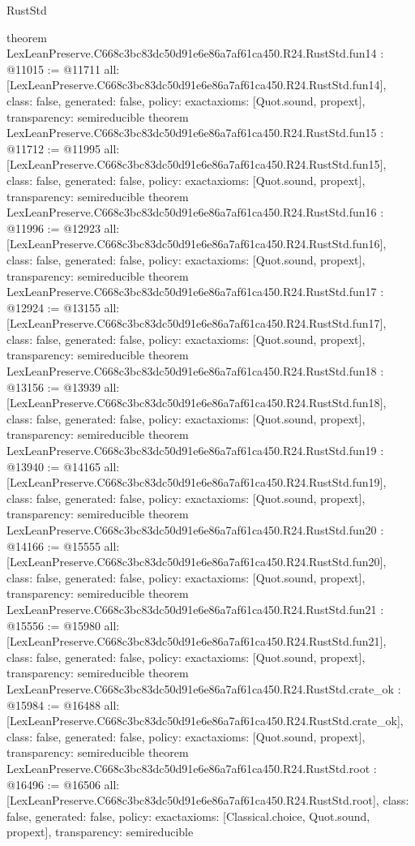 \begin{lexlean}{RustStd}
\begin{coremodule}
{}
theorem LexLeanPreserve.C668c3bc83dc50d91e6e86a7af61ca450.R24.RustStd.fun14 : @11015 := @11711 {
  all: [LexLeanPreserve.C668c3bc83dc50d91e6e86a7af61ca450.R24.RustStd.fun14],
  class: false,
  generated: false,
  policy: exact{axioms: [Quot.sound, propext]},
  transparency: semireducible
}
theorem LexLeanPreserve.C668c3bc83dc50d91e6e86a7af61ca450.R24.RustStd.fun15 : @11712 := @11995 {
  all: [LexLeanPreserve.C668c3bc83dc50d91e6e86a7af61ca450.R24.RustStd.fun15],
  class: false,
  generated: false,
  policy: exact{axioms: [Quot.sound, propext]},
  transparency: semireducible
}
theorem LexLeanPreserve.C668c3bc83dc50d91e6e86a7af61ca450.R24.RustStd.fun16 : @11996 := @12923 {
  all: [LexLeanPreserve.C668c3bc83dc50d91e6e86a7af61ca450.R24.RustStd.fun16],
  class: false,
  generated: false,
  policy: exact{axioms: [Quot.sound, propext]},
  transparency: semireducible
}
theorem LexLeanPreserve.C668c3bc83dc50d91e6e86a7af61ca450.R24.RustStd.fun17 : @12924 := @13155 {
  all: [LexLeanPreserve.C668c3bc83dc50d91e6e86a7af61ca450.R24.RustStd.fun17],
  class: false,
  generated: false,
  policy: exact{axioms: [Quot.sound, propext]},
  transparency: semireducible
}
theorem LexLeanPreserve.C668c3bc83dc50d91e6e86a7af61ca450.R24.RustStd.fun18 : @13156 := @13939 {
  all: [LexLeanPreserve.C668c3bc83dc50d91e6e86a7af61ca450.R24.RustStd.fun18],
  class: false,
  generated: false,
  policy: exact{axioms: [Quot.sound, propext]},
  transparency: semireducible
}
theorem LexLeanPreserve.C668c3bc83dc50d91e6e86a7af61ca450.R24.RustStd.fun19 : @13940 := @14165 {
  all: [LexLeanPreserve.C668c3bc83dc50d91e6e86a7af61ca450.R24.RustStd.fun19],
  class: false,
  generated: false,
  policy: exact{axioms: [Quot.sound, propext]},
  transparency: semireducible
}
theorem LexLeanPreserve.C668c3bc83dc50d91e6e86a7af61ca450.R24.RustStd.fun20 : @14166 := @15555 {
  all: [LexLeanPreserve.C668c3bc83dc50d91e6e86a7af61ca450.R24.RustStd.fun20],
  class: false,
  generated: false,
  policy: exact{axioms: [Quot.sound, propext]},
  transparency: semireducible
}
theorem LexLeanPreserve.C668c3bc83dc50d91e6e86a7af61ca450.R24.RustStd.fun21 : @15556 := @15980 {
  all: [LexLeanPreserve.C668c3bc83dc50d91e6e86a7af61ca450.R24.RustStd.fun21],
  class: false,
  generated: false,
  policy: exact{axioms: [Quot.sound, propext]},
  transparency: semireducible
}
theorem LexLeanPreserve.C668c3bc83dc50d91e6e86a7af61ca450.R24.RustStd.crate_ok : @15984 := @16488 {
  all: [LexLeanPreserve.C668c3bc83dc50d91e6e86a7af61ca450.R24.RustStd.crate_ok],
  class: false,
  generated: false,
  policy: exact{axioms: [Quot.sound, propext]},
  transparency: semireducible
}
theorem LexLeanPreserve.C668c3bc83dc50d91e6e86a7af61ca450.R24.RustStd.root : @16496 := @16506 {
  all: [LexLeanPreserve.C668c3bc83dc50d91e6e86a7af61ca450.R24.RustStd.root],
  class: false,
  generated: false,
  policy: exact{axioms: [Classical.choice, Quot.sound, propext]},
  transparency: semireducible
}


\end{coremodule}
\end{lexlean}
